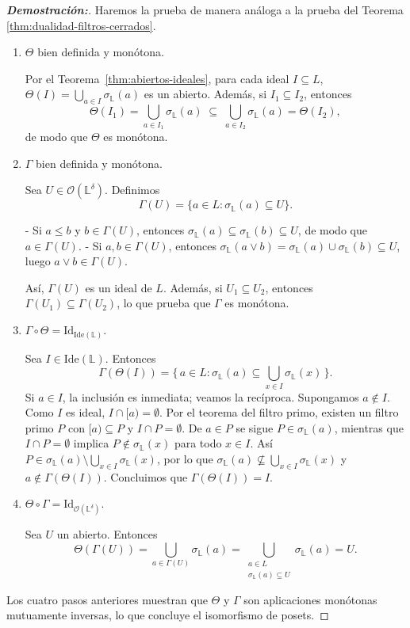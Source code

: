 \documentclass[12pt]{book}
\newcommand{\Id}{\mathrm{Id}}
\begin{document}
\begin{proof}[\textbf{Demostración:}]
Haremos la prueba de manera análoga a la prueba del Teorema \ref{thm:dualidad-filtros-cerrados}.

\begin{enumerate}
\item \(\Theta\) bien definida y monótona.  

Por el Teorema~\ref{thm:abiertos-ideales}, para cada ideal \(I\subseteq L\),
\(\Theta(I)=\bigcup_{a\in I}\sigma_{\mathbb{L}}(a)\) es un abierto.  
Además, si \(I_1 \subseteq I_2\), entonces
\[
  \Theta(I_1)=\bigcup_{a\in I_1}\sigma_{\mathbb{L}}(a)
  \;\subseteq\;
  \bigcup_{a\in I_2}\sigma_{\mathbb{L}}(a)=\Theta(I_2),
\]
de modo que \(\Theta\) es monótona.

\medskip
\item \(\Gamma\) bien definida y monótona.  

Sea \(U\in\mathcal{O}(\mathbb{L}^\delta)\). Definimos
\[
\Gamma(U)=\{a\in L : \sigma_{\mathbb{L}}(a)\subseteq U\}.
\]

- Si \(a\le b\) y \(b\in\Gamma(U)\), entonces
  \(\sigma_{\mathbb{L}}(a)\subseteq\sigma_{\mathbb{L}}(b)\subseteq U\), de modo que \(a\in\Gamma(U)\).
- Si \(a,b\in\Gamma(U)\), entonces
  \(\sigma_{\mathbb{L}}(a\vee b)=\sigma_{\mathbb{L}}(a)\cup\sigma_{\mathbb{L}}(b)\subseteq U\), luego \(a\vee b\in\Gamma(U)\).

Así, \(\Gamma(U)\) es un ideal de \(L\).  
Además, si \(U_1\subseteq U_2\), entonces 
\(\Gamma(U_1)\subseteq\Gamma(U_2)\), lo que prueba que \(\Gamma\) es monótona.


\item $\Gamma\circ\Theta=\Id_{\mathrm{Ide}(\mathbb{L})}$.  

Sea $I\in\mathrm{Ide}(\mathbb{L})$. Entonces
\[
\Gamma(\Theta(I))
=\{\,a\in L:\sigma_{\mathbb{L}}(a)\subseteq\bigcup_{x\in I}\sigma_{\mathbb{L}}(x)\,\}.
\]
Si $a\in I$, la inclusión es inmediata; veamos la recíproca.  
Supongamos $a\notin I$. Como $I$ es ideal, $I\cap[a)=\emptyset$.  
Por el teorema del filtro primo, existen un filtro primo $P$ con 
$[a)\subseteq P$ y $I\cap P=\emptyset$.  
De $a\in P$ se sigue $P\in\sigma_{\mathbb{L}}(a)$, mientras que
$I\cap P=\emptyset$ implica $P\notin\sigma_{\mathbb{L}}(x)$ para todo $x\in I$.  
Así $P\in\sigma_{\mathbb{L}}(a)\setminus\bigcup_{x\in I}\sigma_{\mathbb{L}}(x)$, 
por lo que $\sigma_{\mathbb{L}}(a)\nsubseteq\bigcup_{x\in I}\sigma_{\mathbb{L}}(x)$
y $a\notin\Gamma(\Theta(I))$.  
Concluimos que $\Gamma(\Theta(I))=I$.


\medskip
\item \(\Theta\circ\Gamma=\Id_{\mathcal{O}(\mathbb{L}^\delta)}\).  

Sea \(U\) un abierto. Entonces
\[
\Theta(\Gamma(U))
=\bigcup_{a\in\Gamma(U)}\sigma_{\mathbb{L}}(a)
=\bigcup_{\substack{a\in L\\\sigma_{\mathbb{L}}(a)\subseteq U}}\sigma_{\mathbb{L}}(a)=U.
\]
\end{enumerate}

\medskip
Los cuatro pasos anteriores muestran que \(\Theta\) y \(\Gamma\) son aplicaciones monótonas mutuamente inversas, lo que concluye el isomorfismo de posets.
\end{proof}
\end{document}
